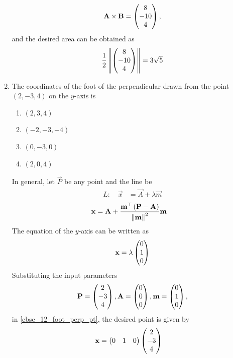 \documentclass[journal,12pt,twocolumn]{IEEEtran}
\renewcommand\thesection{\arabic{section}}
\begin{document}
\begin{enumerate}[label=\thesection.\arabic*.,ref=\thesection.\theenumi]
\begin{align}
		\end{align}
		\begin{align}
			\mathbf{A}  \times 
			\mathbf{B}  = \begin{pmatrix}8 \\ -10 \\ 4\end{pmatrix},
		\end{align}
		and the  desired area can be obtained as 
		\begin{align}
			\frac{1}{2}\left\lVert\begin{pmatrix}8 \\ -10 \\ 4\end{pmatrix}\right\rVert = 3 \sqrt{5}
		\end{align}
\item  The coordinates of the foot of the perpendicular drawn from the point $ \left(2,-3,4 \right) $ on the $y$-axis is 

\begin{enumerate}
    \item $\left(2,3,4\right)$
    \item $\left(-2,-3,-4\right)$
    \item $\left(0,-3,0\right)$
    \item $\left(2,0,4\right)$
\end{enumerate}
\solution 
In general, let $\vec{P}$ be any point and the line be
\begin{align}
	\label{cbse_12_foot_perp_line}
	L: \quad	\vec{x} &=  \vec{A} + \lambda \vec{m}
		\end{align}
\begin{align}
	\label{cbse_12_foot_perp_pt}
\mathbf{x} &=  \mathbf{A} + \frac{	\mathbf{m}^{\top}\left(\mathbf{P}  -  \mathbf{A}\right)}{\left\lVert\mathbf{m}\right\rVert^2}\mathbf{m}
		\end{align}
The equation of the $y$-axis can be written as	
		\begin{align}
			\mathbf{x} = \lambda 	\begin{pmatrix}0 \\ 1 \\ 0\end{pmatrix} 
		\end{align}
		Substituting the input parameters 
		\begin{align}
			\mathbf{P} =  	\begin{pmatrix}2 \\ -3 \\ 4\end{pmatrix},  
			\mathbf{A} =  	\begin{pmatrix}0 \\ 0 \\ 0\end{pmatrix},  
			\mathbf{m} =  	\begin{pmatrix}0 \\ 1 \\ 0\end{pmatrix},  
		\end{align}
	in \eqref{cbse_12_foot_perp_pt},
  the desired point is given by 
\begin{align}
	\vec{x} &=   \myvec{0 & 1 & 0}\myvec{2 \\-3 \\4 } 

\end{align}
\end{enumerate}
\end{document}
